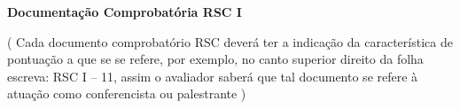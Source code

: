 \label{documentacao-probatoria-rsc-i}

\begin{center}
	\begin{LARGE}
		\textbf{Documentação Comprobatória RSC I}
	\end{LARGE}
\end{center}

\begin{center}
	{\color{red}
		( Cada documento comprobatório RSC deverá ter a indicação da característica de pontuação a que se se refere, por exemplo, no canto superior direito da folha escreva: RSC I – 11, assim o avaliador saberá que tal documento se refere à atuação como conferencista ou palestrante )
	}
\end{center}